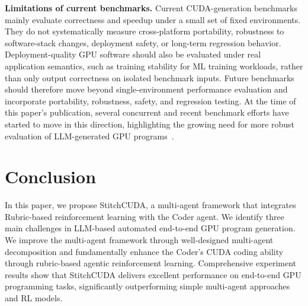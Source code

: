 \textbf{Limitations of current benchmarks.}
Current CUDA-generation benchmarks~\cite{kernelbench,zhu2026cudabench,li2025tritonbench} mainly evaluate correctness and speedup under a small set of fixed environments. They do not systematically measure cross-platform portability, robustness to software-stack changes, deployment safety, or long-term regression behavior. Deployment-quality GPU software should also be evaluated under real application semantics, such as training stability for ML training workloads, rather than only output correctness on isolated benchmark inputs. Future benchmarks should therefore move beyond single-environment performance evaluation and incorporate portability, robustness, safety, and regression testing. At the time of this paper's publication, several concurrent and recent benchmark efforts have started to move in this direction, highlighting the growing need for more robust evaluation of LLM-generated GPU programs~\cite{computeeval,cudahercules,cudabeaver}.



\section{Conclusion}
In this paper, we propose StitchCUDA, a multi-agent framework that integrates Rubric-based reinforcement learning with the Coder agent. We identify three main challenges in LLM-based automated end-to-end GPU program generation. We improve the multi-agent framework through well-designed multi-agent decomposition and fundamentally enhance the Coder's CUDA coding ability through rubric-based agentic reinforcement learning. Comprehensive experiment results show that StitchCUDA delivers excellent performance on end-to-end GPU programming tasks, significantly outperforming simple multi-agent approaches and RL models.